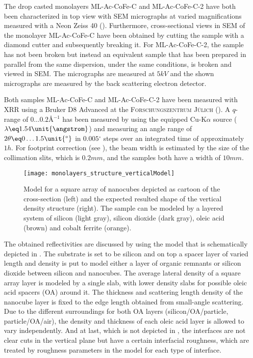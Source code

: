 \documentclass[\main/dresen_thesis.tex]{subfiles}
\begin{document}
    The drop casted monolayers ML-Ac-CoFe-C and ML-Ac-CoFe-C-2 have both been characterized in top view with SEM micrographs at varied magnifications measured with a Neon Zeiss 40 ().
    Furthermore, cross-sectional views in SEM of the monolayer ML-Ac-CoFe-C have been obtained by cutting the sample with a diamond cutter and subsequently breaking it.
    For ML-Ac-CoFe-C-2, the sample has not been broken but instead an equivalent sample that has been prepared in parallel from the same dispersion, under the same conditions, is broken and viewed in SEM.
    The micrographs are measured at $5 \unit{kV}$ and the shown micrographs are measured by the back scattering electron detector.

    Both samples ML-Ac-CoFe-C and ML-Ac-CoFe-C-2 have been measured with XRR using a Bruker D8 Advanced at the \textsc{Forschungszentrum J\"ulich} ().
    A $q$-range of $0 \ldots 0.2 \unit{\angstrom^{-1}}$ has been measured by using the equipped Cu-K$\alpha$ source ($\lambda \eq 1.54 \unit{\angstrom}$) and measuring an angle range of $2 \theta \eq 0 \ldots 1.5 \unit{^\circ}$ in $0.005 \unit{^\circ}$ steps over an integrated time of approximately $1 \unit{h}$.
    For footprint correction (see ), the beam width is estimated by the size of the collimation slits, which is $0.2 \unit{mm}$, and the samples both have a width of $10 \unit{mm}$.

    \begin{figure}[tb]
      \centering
      \texttt{[image: monolayers\_structure\_verticalModel]}
      \caption{\label{fig:monolayers:structure:verticalModel}Model for a square array of nanocubes depicted as cartoon of the cross-section (left) and the expected resulted shape of the vertical density structure (right). The sample can be modeled by a layered system of silicon (light gray), silicon dioxide (dark gray), oleic acid (brown) and cobalt ferrite (orange). }
    \end{figure}

    The obtained reflectivities are discussed by using the model that is schematically depicted in .
    The substrate is set to be silicon and on top a spacer layer of varied length and density is put to model either a layer of organic remnants or silicon dioxide between silicon and nanocubes.
    The average lateral density of a square array layer is modeled by a single slab, with lower density slabs for possible oleic acid spacers (OA) around it.
    The thickness and scattering length density of the nanocube layer is fixed to the edge length obtained from small-angle scattering.
    Due to the different surroundings for both OA layers (silicon/OA/particle, particle/OA/air), the density and thickness of each oleic acid layer is allowed to vary independently.
    And at last, which is not depicted in , the interfaces are not clear cuts in the vertical plane but have a certain interfacial roughness, which are treated by roughness parameters in the model for each type of interface.
  
\end{document}
